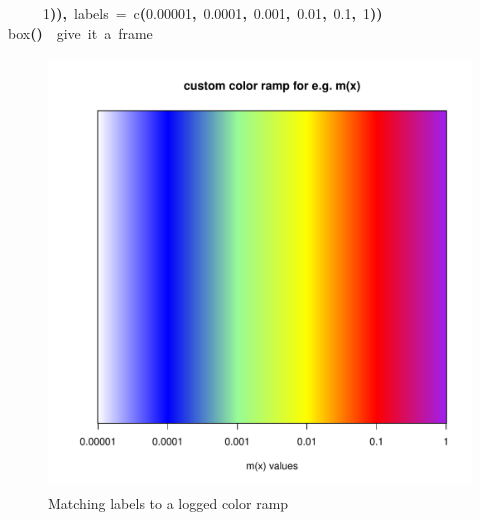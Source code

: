\documentclass[a4paper]{article}
\newcommand{\hlnumber}[1]{\textcolor[rgb]{0.0823529411764706,0.0784313725490196,0.709803921568627}{#1}}%
\newcommand{\hlfunctioncall}[1]{\textcolor[rgb]{1,0,0}{#1}}%
\newcommand{\hlkeyword}[1]{\textcolor[rgb]{0,0,0}{\textbf{#1}}}%
\newcommand{\hlargument}[1]{\textcolor[rgb]{0.694117647058824,0.247058823529412,0.0196078431372549}{#1}}%
\newcommand{\hlcomment}[1]{\textcolor[rgb]{0.8,0.8,0.8}{#1}}%
\newcommand{\hlprompt}[1]{\textcolor[rgb]{0,0,0}{#1}}%
\newcommand{\hlstd}[1]{\textcolor[rgb]{0,0,0}{#1}}%
\newenvironment{Houtput}{\raggedright}{%
%
}
\begin{document}
\begin{Houtput}
\hlstd{}\hlprompt{{\ }}{\ }{\ }{\ }{\ }\hlnumber{1}\hlkeyword{)}\hlkeyword{)}\hlkeyword{,}{\ }\hlargument{labels}{\ }\hlargument{=}{\ }\hlfunctioncall{c}\hlkeyword{(}\hlnumber{0.00001}\hlkeyword{,}{\ }\hlnumber{0.0001}\hlkeyword{,}{\ }\hlnumber{0.001}\hlkeyword{,}{\ }\hlnumber{0.01}\hlkeyword{,}{\ }\hlnumber{0.1}\hlkeyword{,}{\ }\hlnumber{1}\hlkeyword{)}\hlkeyword{)}\mbox{}
\normalfont
\hspace*{\fill}\\
\hlstd{}\ttfamily\noindent
\hlprompt{\usebox{\hlnormalsizeboxgreaterthan}{\ }}\hlfunctioncall{box}\hlkeyword{(}\hlkeyword{)}{\ }{\ }\hlcomment{\usebox{\hlnormalsizeboxhash}{\ }give{\ }it{\ }a{\ }frame}\mbox{}
\normalfont
\hspace*{\fill}\\
\hlstd{}
\end{Houtput}

\begin{figure}[H]
\centering
\includegraphics[width=4.5in,height=4.5in]{figs/colorramp.pdf}
\caption{Matching labels to a logged color ramp}
\end{figure}
\end{document}

